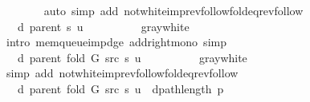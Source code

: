 \begin{isabellebody}
\ \ \ \ \ \ \isamarkupfalse%
\ {\isacharparenleft}{\kern0pt}auto\ simp\ add{\isacharcolon}{\kern0pt}\ not{\isacharunderscore}{\kern0pt}white{\isacharunderscore}{\kern0pt}imp{\isacharunderscore}{\kern0pt}rev{\isacharunderscore}{\kern0pt}follow{\isacharunderscore}{\kern0pt}fold{\isacharunderscore}{\kern0pt}eq{\isacharunderscore}{\kern0pt}rev{\isacharunderscore}{\kern0pt}follow{\isacharparenright}{\kern0pt}\isanewline
\ \ \ \ \isamarkupfalse%
\ \isamarkupfalse%
\ {\isachardoublequoteopen}{\isachardot}{\kern0pt}{\isachardot}{\kern0pt}{\isachardot}{\kern0pt}\ {\isasymle}\ d\ {\isacharparenleft}{\kern0pt}parent\ s{\isacharparenright}{\kern0pt}\ u\ {\isacharplus}{\kern0pt}\ {}{\isachardoublequoteclose}\isanewline
\ \ \ \ \ \ \isamarkupfalse%
\ gray{\isacharunderscore}{\kern0pt}white\isanewline
\ \ \ \ \ \ \isamarkupfalse%
\ {\isacharparenleft}{\kern0pt}intro\ mem{\isacharunderscore}{\kern0pt}queue{\isacharunderscore}{\kern0pt}imp{\isacharunderscore}{\kern0pt}d{\isacharunderscore}{\kern0pt}ge\ add{\isacharunderscore}{\kern0pt}right{\isacharunderscore}{\kern0pt}mono{\isacharparenright}{\kern0pt}\ simp\isanewline
\ \ \ \ \isamarkupfalse%
\ \isamarkupfalse%
\ {\isachardoublequoteopen}{\isachardot}{\kern0pt}{\isachardot}{\kern0pt}{\isachardot}{\kern0pt}\ {\isacharequal}{\kern0pt}\ d\ {\isacharparenleft}{\kern0pt}parent\ {\isacharparenleft}{\kern0pt}fold\ G\ src\ s{\isacharparenright}{\kern0pt}{\isacharparenright}{\kern0pt}\ u\ {\isacharplus}{\kern0pt}\ {}{\isachardoublequoteclose}\isanewline
\ \ \ \ \ \ \isamarkupfalse%
\ gray{\isacharunderscore}{\kern0pt}white\isanewline
\ \ \ \ \ \ \isamarkupfalse%
\ {\isacharparenleft}{\kern0pt}simp\ add{\isacharcolon}{\kern0pt}\ not{\isacharunderscore}{\kern0pt}white{\isacharunderscore}{\kern0pt}imp{\isacharunderscore}{\kern0pt}rev{\isacharunderscore}{\kern0pt}follow{\isacharunderscore}{\kern0pt}fold{\isacharunderscore}{\kern0pt}eq{\isacharunderscore}{\kern0pt}rev{\isacharunderscore}{\kern0pt}follow{\isacharparenright}{\kern0pt}\isanewline
\ \ \ \ \isamarkupfalse%
\ \isamarkupfalse%
\ {\isachardoublequoteopen}{\isachardot}{\kern0pt}{\isachardot}{\kern0pt}{\isachardot}{\kern0pt}\ {\isasymle}\ d\ {\isacharparenleft}{\kern0pt}parent\ {\isacharparenleft}{\kern0pt}fold\ G\ src\ s{\isacharparenright}{\kern0pt}{\isacharparenright}{\kern0pt}\ u\ {\isacharplus}{\kern0pt}\ dpath{\isacharunderscore}{\kern0pt}length\ p{\isachardoublequoteclose}\isanewline

\end{isabellebody}
